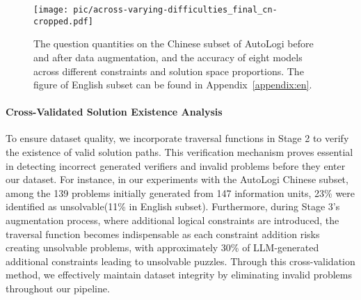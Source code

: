 \begin{figure}[!t]
  \centering
  \texttt{[image: pic/across-varying-difficulties\_final\_cn-cropped.pdf]}
  \caption{The question quantities on the Chinese subset of AutoLogi before and after data augmentation, and the accuracy of eight models across different constraints and solution space proportions. The figure of English subset can be found in Appendix~\ref{appendix:en}.}
  \label{fig:varying-difficulty}
\end{figure}

\paragraph{Cross-Validated Solution Existence Analysis}
\label{sec:solution-exist}
To ensure dataset quality, we incorporate traversal functions in Stage 2 to verify the existence of valid solution paths. This verification mechanism proves essential in detecting incorrect generated verifiers and invalid problems before they enter our dataset. For instance, in our experiments with the AutoLogi Chinese subset, among the 139 problems initially generated from 147 information units, 23\% were identified as unsolvable(11\% in English subset). Furthermore, during Stage 3's augmentation process, where additional logical constraints are introduced, the traversal function becomes indispensable as each constraint addition risks creating unsolvable problems, with approximately 30\% of LLM-generated additional constraints leading to unsolvable puzzles. Through this cross-validation method, we effectively maintain dataset integrity by eliminating invalid problems throughout our pipeline.


